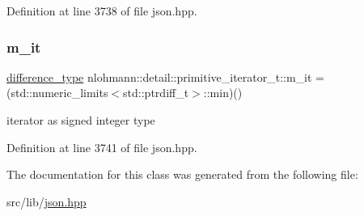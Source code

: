 Definition at line 3738 of file json.\+hpp.

\mbox{\label{classnlohmann_1_1detail_1_1primitive__iterator__t_a4357355113b0cd7e12b15c2e93703510}} 
\subsubsection{\texorpdfstring{m\+\_\+it}{m\_it}}
{\footnotesize\ttfamily \hyperlink{classnlohmann_1_1detail_1_1primitive__iterator__t_af3db0d5c90de427d51645fe73a015553}{difference\+\_\+type} nlohmann\+::detail\+::primitive\+\_\+iterator\+\_\+t\+::m\+\_\+it = (std\+::numeric\+\_\+limits$<$std\+::ptrdiff\+\_\+t$>$\+::min)()\hspace{0.3cm}{\ttfamily [private]}}



iterator as signed integer type 



Definition at line 3741 of file json.\+hpp.



The documentation for this class was generated from the following file\+:\begin{DoxyCompactItemize}
\item 
src/lib/\hyperlink{json_8hpp}{json.\+hpp}\end{DoxyCompactItemize}
